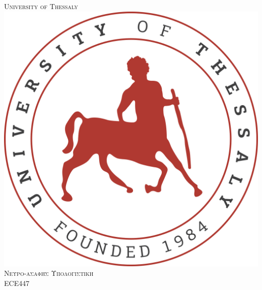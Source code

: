 \documentclass[a4paper,12pt]{article}
\begin{document}
	
	\begin{titlepage}
		\thispagestyle{first}
		
		\newcommand{\HRule}{\rule{\linewidth}{0.5mm}} %
		
		\center %
		
		
		\textsc{\LARGE University of Thessaly}\\[1.6cm] %
		\includegraphics[scale=.5]{Images/uth-logo.png}\\[1cm] %
		\textsc{\Large Νευρο-ασαφής Υπολογιστική}\\[0.6cm] %
		\textsc{\large ECE447}\\[0.5cm] %
		
		

\end{titlepage}
\end{document}
